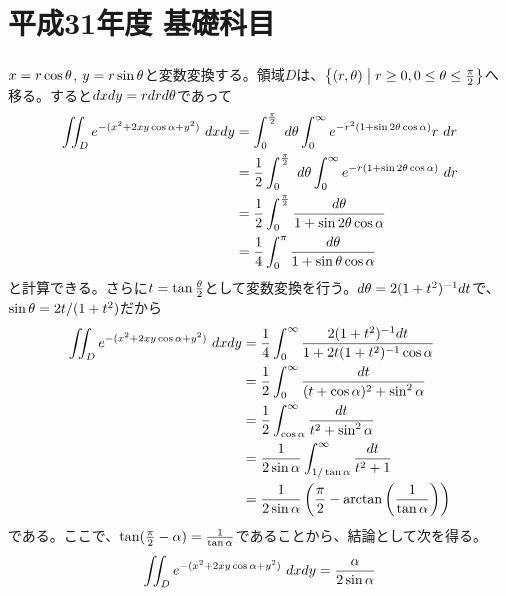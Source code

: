 \section{平成31年度 基礎科目}


\subsubsection{}

\begin{sol}
$x = r \cos {\theta}$, $y = r \sin {\theta}$と変数変換する。領域$D$は、$\left\{ (r,{\theta}) \mathrel{} \middle| \mathrel{} r \geq 0, 0 \leq {\theta} \leq \frac{\pi}{2}  \right\}$へ移る。すると$dx dy = r dr d{\theta}$であって
\begin{align*}
  \iint_D e^{-(x^2 + 2xy \cos {\alpha} + y^2)} \ dx dy &= \int_0^{\frac{\pi}{2}} \ d{\theta} \int_{0}^{\infty} e^{-r^2(1 + \sin 2 {\theta} \cos {\alpha})} r \ dr \\
  &= \frac{1}{2} \int_0^{\frac{\pi}{2}} \ d{\theta} \int_{0}^{\infty} e^{-r(1 + \sin 2 {\theta} \cos {\alpha})}  \ dr \\
  &= \frac{1}{2} \int_0^{\frac{\pi}{2}} \frac{d {\theta}}{1 + \sin 2{\theta} \cos {\alpha}} \\
  &= \frac{1}{4} \int_0^{\pi} \frac{d {\theta}}{1 + \sin {\theta} \cos {\alpha}}
\end{align*}
と計算できる。さらに$t = \tan \frac{{\theta}}{2}$として変数変換を行う。$d{\theta} = 2(1+t^2)^{-1} dt$で、$\sin {\theta} = 2t / (1+t^2)$だから
\begin{align*}
    \iint_D e^{-(x^2 + 2xy \cos {\alpha} + y^2)} \ dx dy &= \frac{1}{4} \int_0^{\infty} \frac{2(1+t^2)^{-1} dt}{1 + 2t(1+t^2)^{-1}  \cos {\alpha}} \\
    &= \frac{1}{2} \int_0^{\infty} \frac{dt}{(t+ \cos {\alpha})^2 + \sin^2 {\alpha} } \\
    &= \frac{1}{2} \int_{\cos {\alpha}}^{\infty} \frac{dt}{t^2 + \sin^2 {\alpha} } \\
    &= \frac{1}{2 \sin {\alpha}} \int_{1 / \tan {\alpha}}^{\infty} \frac{dt}{t^2 + 1} \\
    &= \frac{1}{2 \sin {\alpha}} \left( \frac{\pi}{2} - \arctan \left( \frac{1}{\tan {\alpha}} \right) \right)
\end{align*}
である。ここで、$\tan(\frac{\pi}{2} - {\alpha} ) = \frac{1}{\tan {\alpha}}$であることから、結論として次を得る。
\[
\iint_D e^{-(x^2 + 2xy \cos {\alpha} + y^2)} \ dx dy = \frac{{\alpha}}{2 \sin {\alpha}}
\]
\end{sol}


